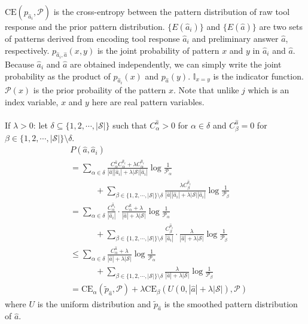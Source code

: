 \documentclass[11pt]{article}
\begin{document}
$\text{CE}(p_{\hat{a}_i}, \mathcal{P})$ is the cross-entropy between the pattern distribution of raw tool response and the prior pattern distribution. $\{E(\hat{a}_i)\}$ and $\{E(\hat{a})\}$ are two sets of patterns derived from encoding tool response $\hat{a}_i$ and preliminary answer $\hat{a}$, respectively. $p_{\hat{a}_i,\hat{a}}(x,y)$ is the joint probability of pattern $x$ and $y$ in $\hat{a}_i$ and $\hat{a}$. Because $\hat{a}_i$ and $\hat{a}$ are obtained independently, we can simply write the joint probability as the product of $p_{\hat{a}_i}(x)$ and $p_{\hat{a}}(y)$. $\mathbb{I}_{x=y}$ is the indicator function. $\mathcal{P}(x)$ is the prior probaility of the pattern $x$. Note that unlike $j$ which is an index variable, $x$ and $y$ here are real pattern variables.\\
\\
If $\lambda > 0$: let $\delta \subseteq \{1,2,\cdots,|\mathcal{S}|\}$ such that $C^{\hat{a}}_\alpha > 0$ for $ \alpha \in \delta$ and $C^{\hat{a}}_\beta = 0$ for $\beta\in \{1,2,\cdots,|\mathcal{S}|\} \setminus \delta$.
\begin{align*}
& P(\hat{a},\hat{a}_i) \\
&= \sum_{\alpha\in \delta} \frac{C^{\hat{a}}_\alpha C^{\hat{a}_i}_\alpha + \lambda C^{\hat{a}_i}_\alpha}{|\hat{a}| |\hat{a}_i| + \lambda|\mathcal{S}||\hat{a}_i|}\log \frac{1}{\mathcal{P}_\alpha} \\ &\quad \quad\quad + \sum_{\beta\in \{1,2,\cdots,|\mathcal{S}|\} \setminus \delta}\frac{\lambda C^{\hat{a}_i}_\beta}{|\hat{a}| |\hat{a}_i| + \lambda|\mathcal{S}||\hat{a}_i|}\log \frac{1}{\mathcal{P}_\beta} \\
&= \sum_{\alpha\in \delta} \frac{C^{\hat{a}_i}_\alpha}{|\hat{a}_i|}\cdot \frac{C^{\hat{a}}_\alpha + \lambda }{|\hat{a}| + \lambda|\mathcal{S}|}\log \frac{1}{\mathcal{P}_\alpha} \\ &\quad \quad \quad + \sum_{\beta\in \{1,2,\cdots,|\mathcal{S}|\} \setminus \delta} \frac{C^{\hat{a}_i}_\beta}{|\hat{a}_i|} \cdot \frac{\lambda}{|\hat{a}| + \lambda|\mathcal{S}|}\log \frac{1}{\mathcal{P}_\beta} \\
&\leq \sum_{\alpha\in \delta} \frac{C^{\hat{a}}_\alpha + \lambda}{|\hat{a}| + \lambda|\mathcal{S}|}\log \frac{1}{\mathcal{P}_\alpha}  \\ &\quad \quad \quad + \sum_{\beta\in \{1,2,\cdots,|\mathcal{S}|\} \setminus \delta}\frac{\lambda}{|\hat{a}| + \lambda|\mathcal{S}|}\log \frac{1}{\mathcal{P}_\beta} \\
&= \text{CE}_{\alpha}(\tilde{p}_{\hat{a}}, \mathcal{P}) + \lambda \text{CE}_{\beta}(U(0, |\hat{a}| + \lambda |\mathcal{S}|), \mathcal{P})
\end{align*}
where $U$ is the uniform distribution and $\tilde{p}_{\hat{a}}$ is the smoothed pattern distribution of $\hat{a}$.
\end{document}
